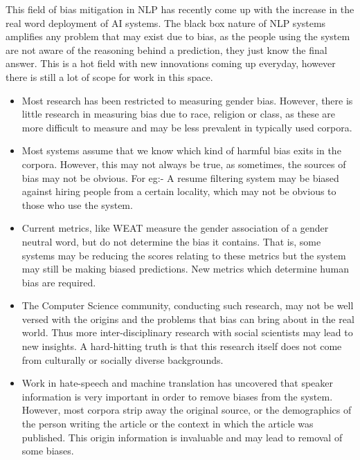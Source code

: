 \documentclass[11pt,a4paper]{article}
\begin{document}
This field of bias mitigation in NLP has recently come up with the increase in the real word deployment of AI systems. The black box nature of NLP systems amplifies any problem that may exist due to bias, as the people using the system are not aware of the reasoning behind a prediction, they just know the final answer. This is a hot field with new innovations coming up everyday, however there is still a lot of scope for work in this space.
\begin{itemize}
    \item Most research has been restricted to measuring gender bias. However, there is little research in measuring bias due to race, religion or class, as these are more difficult to measure and may be less prevalent in typically used corpora. 
    \item Most systems assume that we know which kind of harmful bias exits in the corpora. However, this may not always be true, as sometimes, the sources of bias may not be obvious. For eg:- A resume filtering system may be biased against hiring people from a certain locality, which may not be obvious to those who use the system.
    \item Current metrics, like WEAT measure the gender association of a gender neutral word, but do not determine the bias it contains. That is, some systems may be reducing the scores relating to these metrics but the system may still be making biased predictions. New metrics which determine human bias are required.
    \item The Computer Science community, conducting such research, may not be well versed with the origins and the problems that bias can bring about in the real world. Thus more inter-disciplinary research with social scientists may lead to new insights. A hard-hitting truth is that this research itself does not come from culturally or socially diverse backgrounds.
    \item Work in hate-speech and machine translation has uncovered that speaker information is very important in order to remove biases from the system. However, most corpora strip away the original source, or the demographics of the person writing the article or the context in which the article was published. This origin information is invaluable and may lead to removal of some biases.
\end{itemize}



\end{document}
